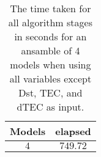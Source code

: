 \begin{table}[!ht]
	\centering
	\begin{tabular}{|c|c|}
		\hline
		Models & elapsed \\ \hline
		$4$ & $749.72$ \\ \hline
	\end{tabular}
	\caption{The time taken for all algorithm stages in seconds for an ansamble of 4 models when using all variables except Dst, TEC, and dTEC as input.}
	\label{tab:time:ansamble:noTEC:4}
\end{table}
